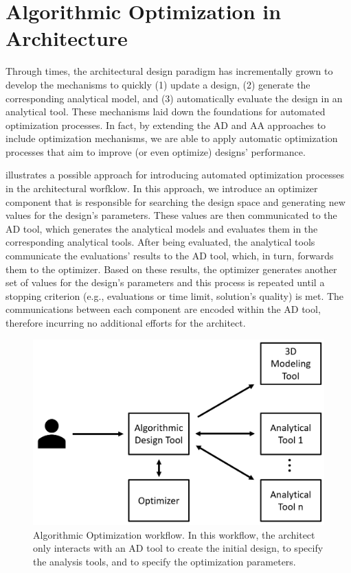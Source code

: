 \section{Algorithmic Optimization in Architecture}
\label{sec: Methodology}

Through times, the architectural design paradigm has incrementally grown to develop the mechanisms to quickly (1) update a design, (2) generate the corresponding analytical model, and (3) automatically evaluate the design in an analytical tool. These mechanisms laid down the foundations for automated optimization processes. In fact, by extending the \ac{AD} and \ac{AA} approaches to include optimization mechanisms, we are able to apply automatic optimization processes that aim to improve (or even optimize) designs' performance. 

 illustrates a possible approach for introducing automated optimization processes in the architectural worfklow. In this approach, we introduce an optimizer component that is responsible for searching the design space and generating new values for the design's parameters. These values are then communicated to the \ac{AD} tool, which generates the analytical models and evaluates them in the corresponding analytical tools. After being evaluated, the analytical tools communicate the evaluations' results to the \ac{AD} tool, which, in turn, forwards them to the optimizer. Based on these results, the optimizer generates another set of values for the design's parameters and this process is repeated until a stopping criterion (e.g., evaluations or time limit, solution's quality) is met. The communications between each component are encoded within the \ac{AD} tool, therefore incurring no additional efforts for the architect.

\begin{figure}[htbp]
	\centering
	\includegraphics[width=\columnwidth]{../report/Images/Solution/algorithmic_optimization.png}
	\caption{Algorithmic Optimization workflow. In this workflow, the architect only interacts with an \ac{AD} tool to create the initial design, to specify the analysis tools, and to specify the optimization parameters.}
	\label{fig:algorithmicoptimization}
\end{figure}

